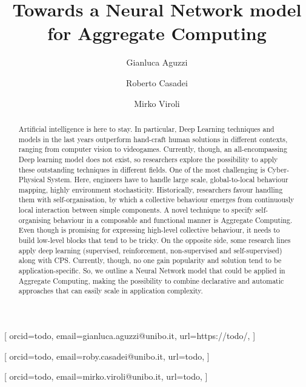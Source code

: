 \documentclass[
]{ceurart}
\begin{document}


\title{Towards a Neural Network model for Aggregate Computing} %

\author[1]{Gianluca Aguzzi}[%
orcid=todo,
email=gianluca.aguzzi@unibo.it,
url=https://todo/,
]
\author[2]{Roberto Casadei}[%
orcid=todo,
email=roby.casadei@unibo.it,
url=todo,
]
\author[2]{Mirko Viroli}[%
orcid=todo,
email=mirko.viroli@unibo.it,
url=todo,
]
\address[1]{Alma Mater Studiorum - Università di Bologna,
  Cesena, Italy}
\begin{abstract}
  Artificial intelligence is here to stay. 
  In particular, Deep Learning techniques and models in the last years outperform hand-craft human solutions in different contexts, ranging from computer vision to videogames.
  Currently, though, an all-encompassing Deep learning model does not exist, so researchers explore the possibility to apply these outstanding techniques in different fields.
  One of the most challenging is Cyber-Physical System. Here, engineers have to handle large scale, global-to-local behaviour mapping,
  highly environment stochasticity. 
  Historically, researchers favour handling them with self-organisation, by which a collective behaviour emerges from continuously local interaction between simple components.
  A novel technique to specify self-organising behaviour in a composable and functional manner is Aggregate Computing. Even though is promising for expressing high-level collective behaviour, 
  it needs to build low-level blocks that tend to be tricky. 
  On the opposite side, some research lines apply deep learning (supervised, reinforcement, non-supervised and self-supervised)
  along with CPS. Currently, though, no one gain popularity and solution tend to be application-specific.
  So, we outline a Neural Network model that could be applied in Aggregate Computing, making the possibility to combine declarative and automatic approaches that can easily scale in application complexity.
\end{abstract}
\end{document}
